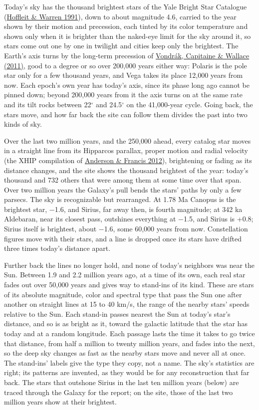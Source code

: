 \documentclass[9pt,twocolumn]{extarticle}
\begin{document}
Today's sky has the thousand brightest stars of the Yale Bright Star Catalogue (\protect\hyperlink{cite.hoffleit1991}{Hoffleit \& Warren 1991}), down to about magnitude 4.6, carried to the year shown by their motion and precession, each tinted by its color temperature and shown only when it is brighter than the naked-eye limit for the sky around it, so stars come out one by one in twilight and cities keep only the brightest. The Earth's axis turns by the long-term precession of \protect\hyperlink{cite.vondrak2011}{Vondrák, Capitaine \& Wallace (2011)}, good to a degree or so over 200,000 years either way: Polaris is the pole star only for a few thousand years, and Vega takes its place 12,000 years from now. Each epoch's own year has today's axis, since its phase long ago cannot be pinned down; beyond 200,000 years from it the axis turns on at the same rate and its tilt rocks between 22$^\circ$ and 24.5$^\circ$ on the 41,000-year cycle. Going back, the stars move, and how far back the site can follow them divides the past into two kinds of sky.

Over the last two million years, and the 250,000 ahead, every catalog star moves in a straight line from its Hipparcos parallax, proper motion and radial velocity (the XHIP compilation of \protect\hyperlink{cite.anderson2012}{Anderson \& Francis 2012}), brightening or fading as its distance changes, and the site shows the thousand brightest of the year: today's thousand and 732 others that were among them at some time over that span. Over two million years the Galaxy's pull bends the stars' paths by only a few parsecs. The sky is recognizable but rearranged. At 1.78 Ma Canopus is the brightest star, $-$1.6, and Sirius, far away then, is fourth magnitude; at 342 ka Aldebaran, near its closest pass, outshines everything at $-$1.5, and Sirius is +0.8; Sirius itself is brightest, about $-$1.6, some 60,000 years from now. Constellation figures move with their stars, and a line is dropped once its stars have drifted three times today's distance apart.

Further back the lines no longer hold, and none of today's neighbors was near the Sun. Between 1.9 and 2.2 million years ago, at a time of its own, each real star fades out over 50,000 years and gives way to stand-ins of its kind. These are stars of its absolute magnitude, color and spectral type that pass the Sun one after another on straight lines at 15 to 40 km/s, the range of the nearby stars' speeds relative to the Sun. Each stand-in passes nearest the Sun at today's star's distance, and so is as bright as it, toward the galactic latitude that the star has today and at a random longitude. Each passage lasts the time it takes to go twice that distance, from half a million to twenty million years, and fades into the next, so the deep sky changes as fast as the nearby stars move and never all at once. The stand-ins' labels give the type they copy, not a name. The sky's statistics are right; its patterns are invented, as they would be for any reconstruction that far back. The stars that outshone Sirius in the last ten million years (below) are traced through the Galaxy for the report; on the site, those of the last two million years show at their brightest.
\end{document}
